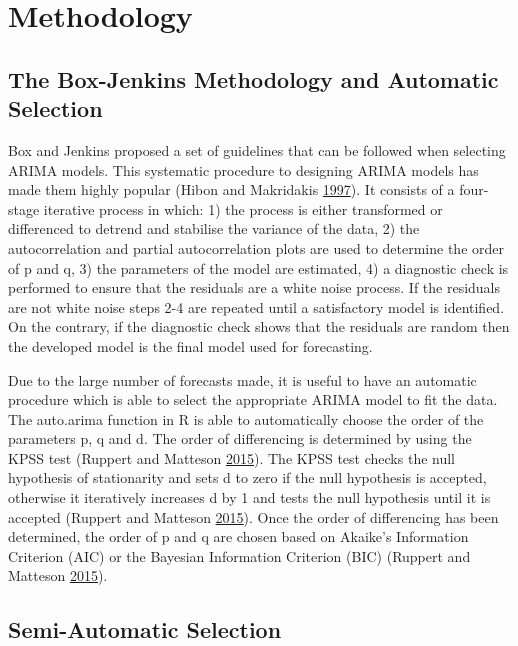 \documentclass[12pt,preprint, authoryear]{elsarticle}
\numberwithin{equation}{section}
\numberwithin{figure}{section}
\numberwithin{table}{section}
\begin{document}
\section{\texorpdfstring{Methodology
\label{Methodology}}{Methodology }}\label{methodology}

\subsection{The Box-Jenkins Methodology and Automatic
Selection}\label{the-box-jenkins-methodology-and-automatic-selection}

Box and Jenkins proposed a set of guidelines that can be followed when
selecting ARIMA models. This systematic procedure to designing ARIMA
models has made them highly popular (Hibon and Makridakis
\protect\hyperlink{ref-spyros1997}{1997}). It consists of a four-stage
iterative process in which: 1) the process is either transformed or
differenced to detrend and stabilise the variance of the data, 2) the
autocorrelation and partial autocorrelation plots are used to determine
the order of p and q, 3) the parameters of the model are estimated, 4) a
diagnostic check is performed to ensure that the residuals are a white
noise process. If the residuals are not white noise steps 2-4 are
repeated until a satisfactory model is identified. On the contrary, if
the diagnostic check shows that the residuals are random then the
developed model is the final model used for forecasting.

Due to the large number of forecasts made, it is useful to have an
automatic procedure which is able to select the appropriate ARIMA model
to fit the data. The auto.arima function in R is able to automatically
choose the order of the parameters p, q and d. The order of differencing
is determined by using the KPSS test (Ruppert and Matteson
\protect\hyperlink{ref-ruppert2015}{2015}). The KPSS test checks the
null hypothesis of stationarity and sets d to zero if the null
hypothesis is accepted, otherwise it iteratively increases d by 1 and
tests the null hypothesis until it is accepted (Ruppert and Matteson
\protect\hyperlink{ref-ruppert2015}{2015}). Once the order of
differencing has been determined, the order of p and q are chosen based
on Akaike's Information Criterion (AIC) or the Bayesian Information
Criterion (BIC) (Ruppert and Matteson
\protect\hyperlink{ref-ruppert2015}{2015}).

\subsection{Semi-Automatic Selection}\label{semi-automatic-selection}
\end{document}
